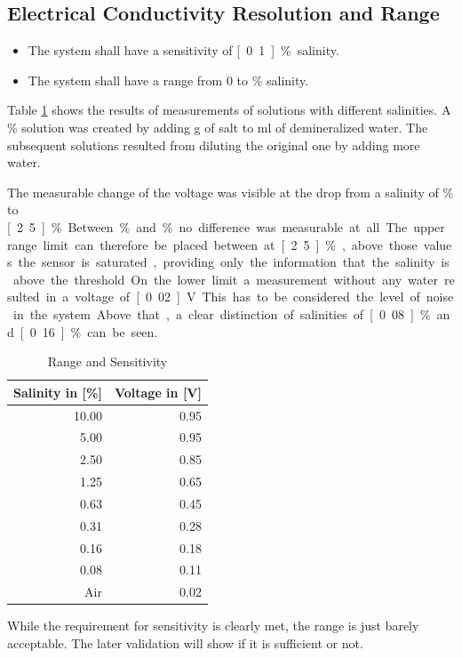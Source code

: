 \subsection{Electrical Conductivity Resolution and Range}


\begin{itemize}
\item The system shall have a sensitivity of  \unit[0.1]{\%} salinity.
\item The system shall have a range from 0 to \unit[5]{\%} salinity.
\end{itemize}

Table \ref{tab:rns} shows the results of measurements of solutions with different salinities. A \unit[10]{\%} solution was created by adding \unit[5]{g} of salt to \unit[50]{ml} of demineralized water. The subsequent solutions resulted from diluting the original one by adding more water.

The measurable change of the voltage was visible at the drop from a salinity of \unit[5]{\%} to \unit[2.5]{\%}. Between \unit[10]{\%} and \unit[5]{\%} no difference was measurable at all. The upper range limit can therefore be placed between at \unit[2.5]{\%}, above those values the sensor is saturated, providing only the information that the salinity is above the threshold.

On the lower limit a measurement without any water resulted in a voltage of \unit[0.02]{V}. This has to be considered the level of noise in the system. Above that, a clear distinction of salinities of \unit[0.08]{\%} and \unit[0.16]{\%} can be seen.

\begin{table}[H]
    \centering

    \caption[Range and Sensitivity]{Range and Sensitivity}
    \label{tab:rns}
    \begin{tabular}{rr}
        	\toprule
        	Salinity in [\%] & Voltage in [V] \tabularnewline
        	\midrule
		10.00 & 0.95 \tabularnewline
        	5.00 & 0.95 \tabularnewline
		2.50 & 0.85 \tabularnewline
		1.25 & 0.65 \tabularnewline
		0.63 & 0.45 \tabularnewline
		0.31 & 0.28 \tabularnewline
		0.16 & 0.18 \tabularnewline
		0.08 & 0.11 \tabularnewline
		Air & 0.02 \tabularnewline
        \bottomrule
    \end{tabular}
\end{table}

While the requirement for sensitivity is clearly met, the range is just barely acceptable. The later validation will show if it is sufficient or not.

